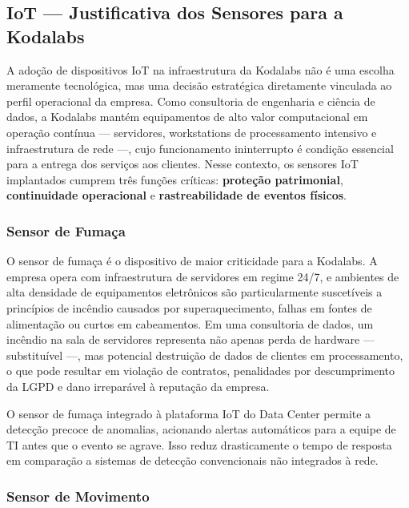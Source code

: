 \subsection{IoT — Justificativa dos Sensores para a Kodalabs}

A adoção de dispositivos IoT na infraestrutura da Kodalabs não é uma escolha
meramente tecnológica, mas uma decisão estratégica diretamente vinculada ao perfil
operacional da empresa. Como consultoria de engenharia e ciência de dados, a
Kodalabs mantém equipamentos de alto valor computacional em operação contínua —
servidores, workstations de processamento intensivo e infraestrutura de rede —,
cujo funcionamento ininterrupto é condição essencial para a entrega dos serviços
aos clientes. Nesse contexto, os sensores IoT implantados cumprem três funções
críticas: \textbf{proteção patrimonial}, \textbf{continuidade operacional} e
\textbf{rastreabilidade de eventos físicos}.

\subsubsection{Sensor de Fumaça}

O sensor de fumaça é o dispositivo de maior criticidade para a Kodalabs. A empresa
opera com infraestrutura de servidores em regime 24/7, e ambientes de alta densidade
de equipamentos eletrônicos são particularmente suscetíveis a princípios de
incêndio causados por superaquecimento, falhas em fontes de alimentação ou curtos
em cabeamentos. Em uma consultoria de dados, um incêndio na sala de servidores
representa não apenas perda de hardware — substituível —, mas potencial destruição
de dados de clientes em processamento, o que pode resultar em violação de contratos,
penalidades por descumprimento da LGPD e dano irreparável à reputação da empresa.

O sensor de fumaça integrado à plataforma IoT do Data Center permite a detecção
precoce de anomalias, acionando alertas automáticos para a equipe de TI antes que
o evento se agrave. Isso reduz drasticamente o tempo de resposta em comparação a
sistemas de detecção convencionais não integrados à rede.

\subsubsection{Sensor de Movimento}

